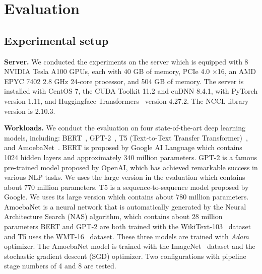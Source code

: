\section{Evaluation}
\label{sec:evaluation}
\subsection{Experimental setup}
\textbf{Server.}
We conducted the experiments on the server which is
equipped with 8 NVIDIA Tesla A100 GPUs, each with 40 GB of memory, PCIe 4.0 $\times$16,
an AMD EPYC 7402 2.8 GHz 24-core processor, and 504 GB of memory.
The server is installed with CentOS 7, the CUDA Toolkit 11.2 and cuDNN 8.4.1,
with PyTorch version 1.11, and Huggingface Transformers~\cite{wolf2020transformers} version 4.27.2. The NCCL library version is 2.10.3.

\textbf{Workloads.}
We conduct the evaluation on four state-of-the-art deep learning models, including:
BERT~\cite{devlinBERTPretrainingDeep2019}, GPT-2~\cite{radfordLanguageModelsAre2019}, T5 (Text-to-Text Transfer Transformer)~\cite{raffelExploringLimitsTransfer2020}, and AmoebaNet~\cite{realRegularizedEvolutionImage2019}.
BERT is proposed by Google AI Language which contains 1024 hidden layers and approximately 340 million parameters.
GPT-2 is a famous pre-trained model proposed by OpenAI,
which has achieved remarkable success in various NLP tasks.
We uses the large version in the evaluation which contains about 770 million parameters.
T5 is a sequence-to-sequence model proposed by Google.
We uses its large version which contains about 780 million parameters.
AmoebaNet is a neural network that is automatically generated by the Neural Architecture Search (NAS) algorithm,
which contains about 28 million parameters
BERT and GPT-2 are both trained with the WikiText-103~\cite{merityPointerSentinelMixture2017} dataset and T5 uses the WMT-16~\cite{bojarFindings2016Conference2016} dataset.
These three models are trained with \emph{Adam} optimizer.
The AmoebaNet model is trained with the ImageNet~\cite{dengImagenetLargeScaleHierarchical2009} dataset and the stochastic gradient descent (SGD) optimizer.
Two configurations with pipeline stage numbers of 4 and 8 are tested.

